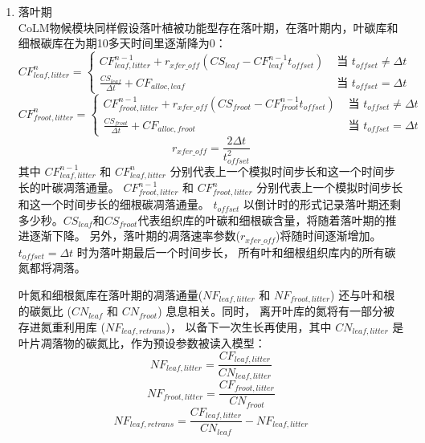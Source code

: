 \begin{enumerate}
\item 落叶期 \\
CoLM物候模块同样假设落叶植被功能型存在落叶期，在落叶期内，叶碳库和细根碳库在为期10多天时间里逐渐降为0：
\begin{equation}
CF_{ {leaf,litter }}^{n}=\left\{\begin{array}{ll}CF_{ {leaf,litter }}^{n-1}+r_{xfer\_{off}}\left(CS_{ {leaf }}-CF_{ {leaf }}^{n-1} t_{ {offset }}\right) & \text{ 当 }  t_{ {offset }} \neq \Delta t \\ 
\frac{CS_{ {leaf }}}{\Delta t}+CF_{ {alloc,leaf }} &  \text{ 当 }  t_{offset}=\Delta t
\end{array}\right.
\end{equation}
\begin{equation}
CF_{ {froot },  { litter }}^{n}=\left\{\begin{array}{ll}CF_{ {froot }, litter}^{n-1}+r_{xfer\_off}\left(CS_{ {froot }}-CF_{ {froot }}^{n-1} t_{offset}\right) &  \text{ 当 }  t_{offset} \neq \Delta t \\ 
\frac{CS_{ {froot }}}{\Delta t}+CF_{ {alloc,froot }} &  \text{ 当 }  t_{offset}=\Delta t
\end{array}\right.
\end{equation}
\begin{equation}
r_{xfer\_off}=\frac{2 \Delta t}{t_{offset}^{2}}
\end{equation}
其中 $CF_{leaf,litter}^{n-1}$ 和 $CF_{leaf,litter}^n$ 分别代表上一个模拟时间步长和这一个时间步长的叶碳凋落通量。
$CF_{froot,litter}^{n-1}$ 和 $CF_{froot,litter}^n$ 分别代表上一个模拟时间步长和这一个时间步长的细根碳凋落通量。
$t_{offset}$ 以倒计时的形式记录落叶期还剩多少秒。$CS_{leaf}$和$CS_{froot}$代表组织库的叶碳和细根碳含量，将随着落叶期的推进逐渐下降。
另外，落叶期的凋落速率参数($r_{{xfer}\_{off}}$)将随时间逐渐增加。$t_{offset}=\Delta t$ 时为落叶期最后一个时间步长，
所有叶和细根组织库内的所有碳氮都将凋落。

叶氮和细根氮库在落叶期的凋落通量($NF_{leaf,litter}$ 和 $NF_{froot,litter}$)
还与叶和根的碳氮比 ($CN_{leaf}$ 和 $CN_{froot}$) 息息相关。同时，
离开叶库的氮将有一部分被存进氮重利用库 ($NF_{leaf,retrans}$)，
以备下一次生长再使用，其中 $CN_{leaf,litter}$ 是叶片凋落物的碳氮比，作为预设参数被读入模型：
\begin{equation}
NF_{leaf,litter} = \frac{CF_{leaf,litter}}{CN_{leaf,litter}}
\end{equation}
\begin{equation}
NF_{froot,litter} = \frac{CF_{froot,litter}}{CN_{froot}}
\end{equation}
\begin{equation}
NF_{leaf,retrans} = \frac{CF_{leaf,litter}}{CN_{leaf}}-NF_{leaf,litter}
\end{equation}


\end{enumerate}
